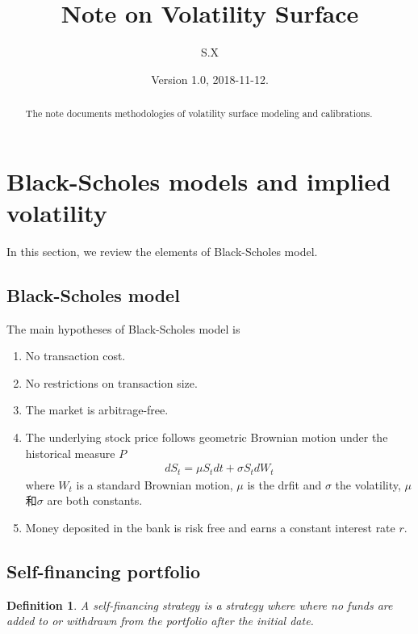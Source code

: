 \documentclass[10pt]{article}
\theoremstyle{plain}
\newtheorem{definition}{Definition}[section]
\numberwithin{equation}{section}
\numberwithin{table}{section}
\newcommand{\s}{\sigma}
\begin{document}
\title{Note on Volatility Surface}
\author{S.X}
\date{Version 1.0, 2018-11-12.}

\maketitle

\begin{abstract}
The note documents methodologies of volatility surface modeling and calibrations.
\end{abstract}

\tableofcontents

\newpage

\section{Black-Scholes models and implied volatility}\label{sect_BS}

In this section, we review the elements of Black-Scholes model.

\subsection{Black-Scholes model}

The main hypotheses of Black-Scholes model is 
\begin{enumerate}
    \item No transaction cost.
    \item No restrictions on transaction size.
    \item The market is arbitrage-free.
    \item The underlying stock price follows geometric Brownian motion under the historical measure $P$
    \begin{eqnarray}
          d S_t = \mu S_t dt+\s S_t d W_t
    \label{GBM}
    \end{eqnarray}
    where $W_t$ is a standard Brownian motion, $\mu$ is the drfit and $\s$ the volatility, $\mu$和$\s$ are both constants. 
    \item Money deposited in the bank is risk free and earns a constant interest rate $r$.    
\end{enumerate}

\subsection{Self-financing portfolio}

\begin{definition}
A self-financing strategy is a strategy where where no funds are added
to or withdrawn from the portfolio after the initial date.
\end{definition}
\end{document}
